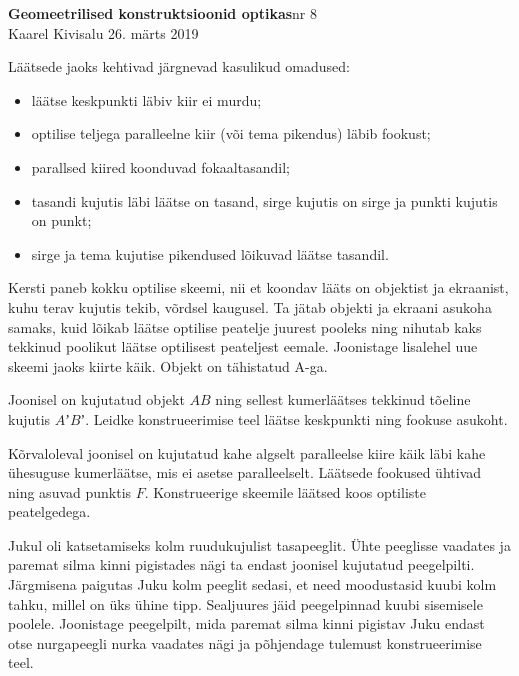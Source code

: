 \documentclass[a4paper,11pt,twocolumn]{article}
\begin{document}
{\huge \textbf{Geomeetrilised konstruktsioonid optikas}\hfill \normalsize{nr 8}} \\
{Kaarel Kivisalu \hfill 26. märts 2019}

Läätsede jaoks kehtivad järgnevad kasulikud omadused:
\begin{itemize}
\item läätse keskpunkti läbiv kiir ei murdu;
\item optilise teljega paralleelne kiir (või tema pikendus) läbib fookust;
\item parallsed kiired koonduvad fokaaltasandil;
\item tasandi kujutis läbi läätse on tasand, sirge kujutis on sirge ja punkti kujutis on punkt;
\item sirge ja tema kujutise pikendused lõikuvad läätse tasandil.
\end{itemize}


\begin{question}[Lõppv 2018, G1][gop3][7cm]
  Kersti paneb kokku optilise skeemi, nii et koondav lääts on
  objektist ja ekraanist, kuhu terav kujutis tekib, võrdsel
  kaugusel. Ta jätab objekti ja ekraani asukoha samaks, kuid lõikab
  läätse optilise peatelje juurest pooleks ning nihutab kaks tekkinud
  poolikut läätse optilisest peateljest eemale. Joonistage lisalehel
  uue skeemi jaoks kiirte käik. Objekt on tähistatud A-ga.
\end{question}

\begin{question}[Lahtine 2015, V5][gop1][7cm]
  Joonisel on kujutatud objekt $AB$ ning sellest kumerläätses tekkinud
  tõeline kujutis $AʼBʼ$. Leidke konstrueerimise teel läätse
  keskpunkti ning fookuse asukoht.
\end{question}

\begin{question}[Lahtine 2014, V7][gop2][\columnwidth]
  Kõrvaloleval joonisel on kujutatud kahe algselt paralleelse kiire
  käik läbi kahe ühesuguse kumerläätse, mis ei asetse
  paralleelselt. Läätsede fookused ühtivad ning asuvad punktis
  $F$. Konstrueerige skeemile läätsed koos optiliste peatelgedega.
\end{question}

\begin{question}[Lõppv 2016, G8][gop4][3cm]
  Jukul oli katsetamiseks kolm ruudukujulist tasapeeglit. Ühte
  peeglisse vaadates ja paremat silma kinni pigistades nägi ta endast
  joonisel kujutatud peegelpilti. Järgmisena paigutas Juku kolm
  peeglit sedasi, et need moodustasid kuubi kolm tahku, millel on üks
  ühine tipp. Sealjuures jäid peegelpinnad kuubi sisemisele
  poolele. Joonistage peegelpilt, mida paremat silma kinni pigistav
  Juku endast otse nurgapeegli nurka vaadates nägi ja põhjendage
  tulemust konstrueerimise teel.
\end{question}
\end{document}
